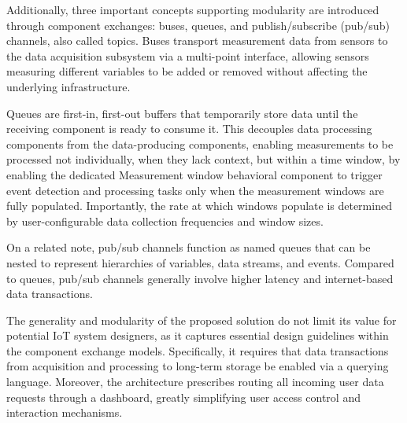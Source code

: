 \documentclass[conference]{IEEEtran}
\begin{document}
Additionally, three important concepts supporting modularity are introduced through component exchanges: buses, queues, and publish/subscribe (pub/sub) channels, also called topics. Buses transport measurement data from sensors to the data acquisition subsystem via a multi-point interface, allowing sensors measuring different variables to be added or removed without affecting the underlying infrastructure.

Queues are first-in, first-out buffers that temporarily store data until the receiving component is ready to consume it. This decouples data processing components from the data-producing components, enabling measurements to be processed not individually, when
they lack context, but within a time window, by enabling the dedicated Measurement window
behavioral component to trigger event detection and processing tasks only when the measurement windows are fully populated.
Importantly, the rate at which windows populate is determined by user-configurable data collection frequencies and window sizes.

On a related note, pub/sub channels function as named queues that can be nested to represent hierarchies of variables, data streams, and events. Compared to queues, pub/sub channels generally involve higher latency and internet-based data transactions.

The generality and modularity of the proposed solution do not limit its value for potential IoT system designers, as it captures essential design guidelines within the component exchange models. Specifically, it requires that data transactions from acquisition and processing to long-term storage be enabled via a querying language. Moreover, the architecture prescribes routing all incoming user data requests through a dashboard, greatly simplifying user access control and interaction mechanisms.
\end{document}
